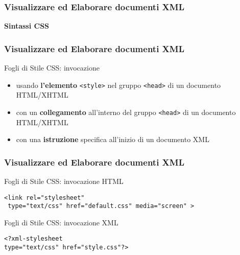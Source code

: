 \documentclass{beamer}
\begin{document}
    \begin{frame}
        \frametitle{Visualizzare ed Elaborare documenti XML}
        \addtocounter{nframe}{1}
        \begin{center}
            \textbf{Sintassi CSS}
        \end{center}
       
    
    \end{frame}

    \begin{frame}
        \frametitle{Visualizzare ed Elaborare documenti XML}
        \addtocounter{nframe}{1}
        \begin{block}{Fogli di Stile CSS: invocazione}
            
            \begin{itemize}
                \item usando \textbf{l’elemento} \texttt{<style>} nel gruppo \texttt{<head>} di un documento HTML/XHTML
                \item con un \textbf{collegamento} all’interno del gruppo \texttt{<head>} di un documento HTML/XHTML
                \item con una \textbf{istruzione} specifica all’inizio di un documento XML
            \end{itemize}
         \end{block}
    
    \end{frame}

    \begin{frame}
        \frametitle{Visualizzare ed Elaborare documenti XML}
        \addtocounter{nframe}{1}
        \begin{block}{Fogli di Stile CSS: invocazione HTML}

            \texttt{<link rel="stylesheet" }
                \\\texttt{ type="text/css" href="default.css" media="screen" > }

         \end{block}

         \begin{block}{Fogli di Stile CSS: invocazione XML}
            
            \texttt{<?xml-stylesheet} 
                \\\texttt{type="text/css" href="style.css"?>}

         \end{block}
    
    \end{frame}
\end{document}

